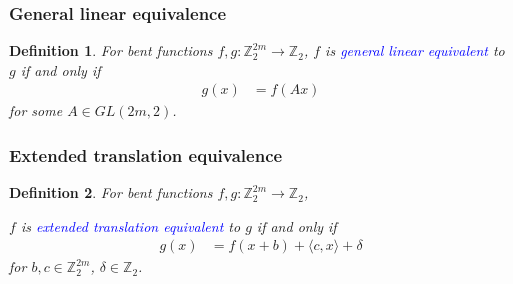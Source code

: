 \documentclass[pdf,sprung,slideColor,nocolorBG]{beamer}
\newenvironment{colortheme}[1]{
\def\ProvidesPackageRCS $##1${\relax}
\renewcommand{\ProcessOptions}{\relax}
\makeatletter

\makeatother
}{}
\newcommand{\mb}[1]{\mathbb{#1}}
\newcommand{\Emph}[1]{\emph{\textcolor{blue}{#1}}}
\newcommand{\To}{\rightarrow}
\newcommand{\Z}{\mb{Z}}
\newtheorem{Def}{Definition}
\begin{document}
\begin{colortheme}{jubata}
\begin{frame}
\frametitle{General linear equivalence}

\begin{Def}
For bent functions $f,g : \Z_2^{2m} \To \Z_2$,
$f$ is \Emph{general linear equivalent} to $g$ if and only if
\begin{align*}
g(x) &= f(A x)
\end{align*}
for some $A \in GL(2m,2)$.
\end{Def}
\end{frame}
\begin{frame}
\frametitle{Extended translation equivalence}

\begin{Def}
For bent functions $f,g : \Z_2^{2m} \To \Z_2$,

$f$ is \Emph{extended translation equivalent} to $g$ if and only if
\begin{align*}
g(x) &= f(x + b) + \langle c, x \rangle + \delta
\end{align*}
for $b, c \in \Z_2^{2m}$, $\delta \in \Z_2$.
\end{Def}
\end{frame}
\end{colortheme}
\end{document}
